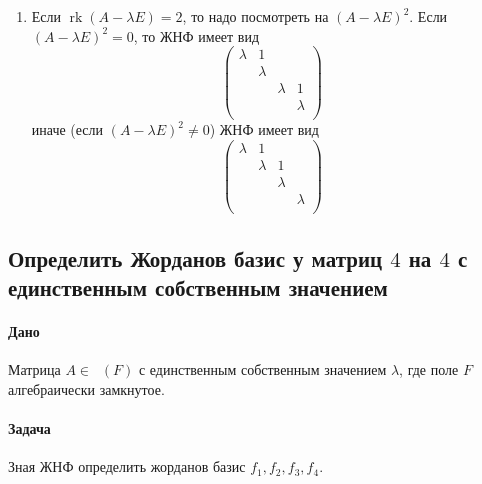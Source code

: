 \documentclass{article}
\newcommand{\Matrix}[2]{\mathop{\mathrm{M}_{#2}}(#1)}
\newcommand{\rk}{\operatorname{rk}}
\begin{document}
\begin{enumerate}
\item Если $\rk(A - \lambda E) = 2$, то надо посмотреть на $(A - \lambda E)^2$. Если $(A - \lambda E)^2 = 0$, то ЖНФ имеет вид
\[
\begin{pmatrix}
{\lambda}&{1}&{}&{}\\
{}&{\lambda}&{}&{}\\
{}&{}&{\lambda}&{1}\\
{}&{}&{}&{\lambda}\\
\end{pmatrix}
\]
иначе (если $(A - \lambda E)^2 \neq 0$) ЖНФ имеет вид
\[
\begin{pmatrix}
{\lambda}&{1}&{}&{}\\
{}&{\lambda}&{1}&{}\\
{}&{}&{\lambda}&{}\\
{}&{}&{}&{\lambda}\\
\end{pmatrix}
\]
\end{enumerate}

\subsection{Определить Жорданов базис у матриц $4$ на $4$ с единственным собственным значением}

\paragraph{Дано} Матрица $A \in \Matrix{F}{4}$ с единственным собственным значением $\lambda$, где поле $F$ алгебраически замкнутое.

\paragraph{Задача} Зная ЖНФ определить жорданов базис $f_1, f_2, f_3, f_4$.
\end{document}
